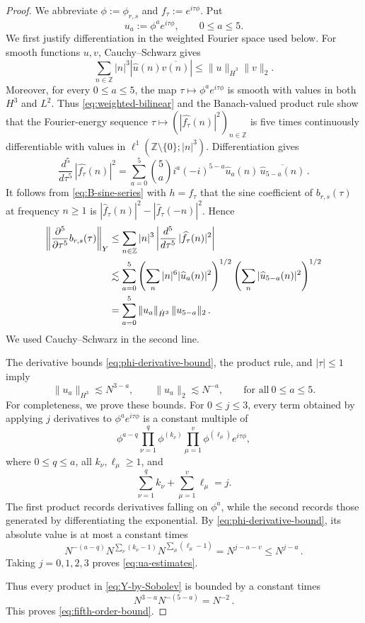 \documentclass[10pt,a4paper]{amsart}
\newcommand{\Z}{\mathbb Z}
\newcommand{\wh}{\widehat}
\begin{document}
\begin{proof}
We abbreviate $\phi:=\phi_{r,s}$ and $f_\tau:=e^{i\tau\phi}$.  Put
\[
 u_a:=\phi^a e^{i\tau\phi},
 \qquad 0\leq a\leq5.
\]
We first justify differentiation in the weighted Fourier space used below. For
smooth functions $u,v$, Cauchy--Schwarz gives
\begin{equation}\label{eq:weighted-bilinear}
 \sum_{n\in\Z}|n|^3
 |\wh u(n)\overline{\wh v(n)}|
 \leq \|u\|_{\dot H^3}\|v\|_2.
\end{equation}
Moreover, for every $0\leq a\leq5$, the map
$\tau\mapsto \phi^a e^{i\tau\phi}$ is smooth with values in both $H^3$ and
$L^2$. Thus \eqref{eq:weighted-bilinear} and the Banach-valued product rule
show that the Fourier-energy sequence
$\tau\mapsto (|\wh{f_\tau}(n)|^2)_{n\in\Z}$ is five times continuously
differentiable with values in
$\ell^1(\Z\setminus\{0\};|n|^3)$. Differentiation gives
\begin{equation}\label{eq:fifth-energy-derivative}
    \frac{d^5}{d\tau^5} \, |\wh{f_\tau}(n)|^2
 =\sum_{a=0}^5\binom5a i^a(-i)^{5-a}
 \wh u_a(n)\,\overline{\wh u_{5-a}(n)} \,.
\end{equation}
It follows from \eqref{eq:B-sine-series} with $h=f_\tau$ that the sine coefficient of $b_{r,s}(\tau)$ at frequency $n\geq1$ is $|\wh f_\tau(n)|^2 - |\wh f_\tau(-n)|^2$.  Hence
\begin{align}
 \left\|\frac{\partial^5}{\partial\tau^5}
 b_{r,s}(\tau)\right\|_Y
 &\leq\sum_{n\in\Z}|n|^3 \left|\frac{d^5}{d\tau^5} \, |\wh{f_\tau}(n)|^2 \right| \notag\\
 &\lesssim \sum_{a=0}^5
 \left(\sum_n|n|^6|\wh u_a(n)|^2\right)^{1/2}
 \left(\sum_n|\wh u_{5-a}(n)|^2\right)^{1/2}\notag\\
 &=\sum_{a=0}^5
 \|u_a\|_{\dot H^3}\,\|u_{5-a}\|_2 \,.
 \label{eq:Y-by-Sobolev}
\end{align}
We used Cauchy--Schwarz in the second line.

The derivative bounds \eqref{eq:phi-derivative-bound}, the product rule, and $|\tau|\leq1$ imply
\begin{equation}\label{eq:ua-estimates}
 \|u_a\|_{H^3}\lesssim N^{3-a},
 \qquad
 \|u_a\|_2\lesssim N^{-a},
 \qquad \text{for all}\ 0\leq a\leq5.
\end{equation}
For completeness, we prove these bounds.  For $0\leq j\leq3$, every term obtained by applying $j$ derivatives to $\phi^a e^{i\tau\phi}$ is a constant multiple of
\[
 \phi^{a-q}
 \prod_{\nu=1}^{q}\phi^{(k_\nu)}
 \prod_{\mu=1}^{v}\phi^{(\ell_\mu)}
 e^{i\tau\phi},
\]
where $0\leq q\leq a$, all $k_\nu,\ell_\mu\geq1$, and
\[
 \sum_{\nu=1}^{q}k_\nu+
 \sum_{\mu=1}^{v}\ell_\mu=j.
\]
The first product records derivatives falling on $\phi^a$, while the second records those generated by differentiating the exponential.  By \eqref{eq:phi-derivative-bound}, its absolute value is at most a constant times
\[
 N^{-(a-q)}
 N^{\sum_\nu(k_\nu-1)}
 N^{\sum_\mu(\ell_\mu-1)}
 = N^{j-a-v} \leq N^{j-a} \,.
\]
Taking $j=0,1,2,3$ proves \eqref{eq:ua-estimates}.  

Thus every product in \eqref{eq:Y-by-Sobolev} is bounded by a constant times 
\[
 N^{3-a}N^{-(5-a)}= N^{-2} \,.
\]
This proves \eqref{eq:fifth-order-bound}.
\end{proof}
\end{document}
